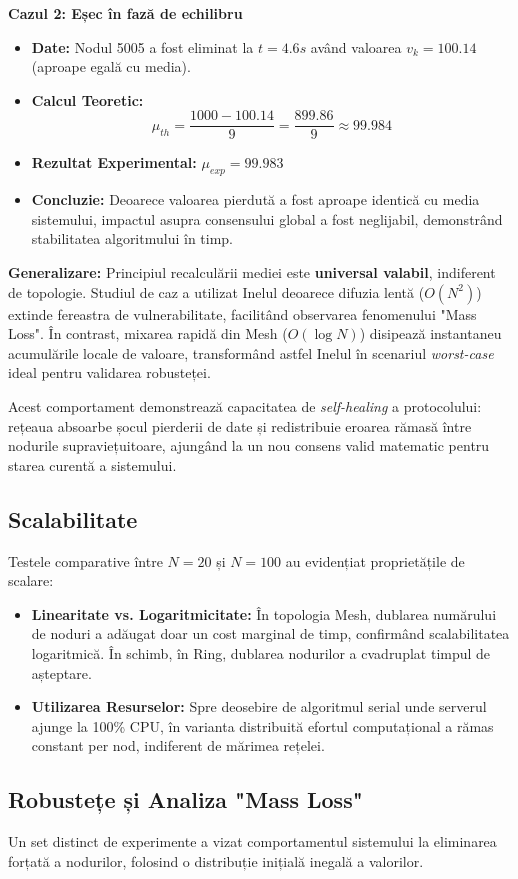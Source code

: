 \textbf{Cazul 2: Eșec în fază de echilibru}
\begin{itemize}
    \item \textbf{Date:} Nodul 5005 a fost eliminat la $t=4.6s$ având valoarea $v_k = 100.14$ (aproape egală cu media).
    \item \textbf{Calcul Teoretic:}
    \[ \mu_{th} = \frac{1000 - 100.14}{9} = \frac{899.86}{9} \approx \mathbf{99.984} \]
    \item \textbf{Rezultat Experimental:} $\mu_{exp} = \mathbf{99.983}$
    \item \textbf{Concluzie:} Deoarece valoarea pierdută a fost aproape identică cu media sistemului, impactul asupra consensului global a fost neglijabil, demonstrând stabilitatea algoritmului în timp.
\end{itemize}

\vspace{0.5em}
\textbf{Generalizare:}
Principiul recalculării mediei este \textbf{universal valabil}, indiferent de topologie. Studiul de caz a utilizat Inelul deoarece difuzia lentă ($O(N^2)$) extinde fereastra de vulnerabilitate, facilitând observarea fenomenului "Mass Loss". În contrast, mixarea rapidă din Mesh ($O(\log N)$) disipează instantaneu acumulările locale de valoare, transformând astfel Inelul în scenariul \textit{worst-case} ideal pentru validarea robusteței.

\vspace{0.5em}
Acest comportament demonstrează capacitatea de \textit{self-healing} a protocolului: rețeaua absoarbe șocul pierderii de date și redistribuie eroarea rămasă între nodurile supraviețuitoare, ajungând la un nou consens valid matematic pentru starea curentă a sistemului.
\subsection{Scalabilitate}
Testele comparative între $N=20$ și $N=100$ au evidențiat proprietățile de scalare:
\begin{itemize}
    \item \textbf{Linearitate vs. Logaritmicitate:} În topologia Mesh, dublarea numărului de noduri a adăugat doar un cost marginal de timp, confirmând scalabilitatea logaritmică. În schimb, în Ring, dublarea nodurilor a cvadruplat timpul de așteptare.
    \item \textbf{Utilizarea Resurselor:} Spre deosebire de algoritmul serial unde serverul ajunge la 100\% CPU, în varianta distribuită efortul computațional a rămas constant per nod, indiferent de mărimea rețelei.
\end{itemize}

\subsection{Robustețe și Analiza "Mass Loss"}
Un set distinct de experimente a vizat comportamentul sistemului la eliminarea forțată a nodurilor, folosind o distribuție inițială inegală a valorilor.
